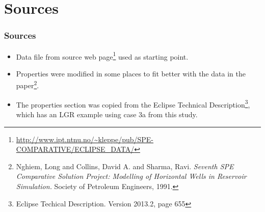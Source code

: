 \section{Sources}

\begin{frame}
    \frametitle{Sources}
    \begin{itemize}
        \item Data file from source web page\footnote{\url{http://www.ipt.ntnu.no/~kleppe/pub/SPE-COMPARATIVE/ECLIPSE_DATA/}} used as starting point.
        \item Properties were modified in some places to fit better with the data in the paper\footnote{Nghiem, Long and Collins, David A. and Sharma, Ravi. \emph{Seventh SPE Comparative Solution Project: Modelling of Horizontal Wells in Reservoir Simulation.} Society of Petroleum Engineers, 1991.}.
        \item The properties section was copied from the Eclipse Technical Description\footnote{Eclipse Techical Description. Version 2013.2, page 655}, which has an LGR example using case 3a from this study.
    \end{itemize}
\end{frame}